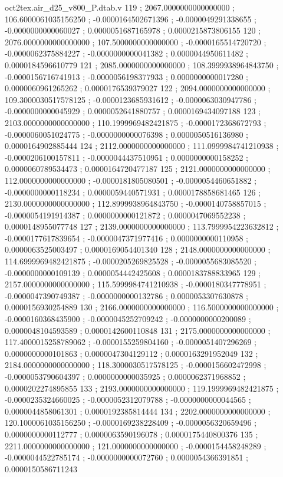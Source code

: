 \begin{filecontents}[overwrite]{oct2tex.air_d25_v800_P.dtab.v}
119 ; 2067.0000000000000000 ; 106.6000061035156250 ; -0.0000164502671396 ; -0.0000049291338655 ; -0.0000000000060027 ; 0.0000051687165978 ; 0.0000215873806155
120 ; 2076.0000000000000000 ; 107.5000000000000000 ; -0.0000165514720720 ; -0.0000062375884227 ; -0.0000000000041382 ; 0.0000044950611482 ; 0.0000184596610779
121 ; 2085.0000000000000000 ; 108.3999938964843750 ; -0.0000156716741913 ; -0.0000056198377933 ; 0.0000000000017280 ; 0.0000060961265262 ; 0.0000176539379027
122 ; 2094.0000000000000000 ; 109.3000030517578125 ; -0.0000123685931612 ; -0.0000063030947786 ; -0.0000000000045929 ; 0.0000052641880757 ; 0.0000169434097188
123 ; 2103.0000000000000000 ; 110.1999969482421875 ; -0.0000172368672793 ; -0.0000060051024775 ; -0.0000000000076398 ; 0.0000050516136980 ; 0.0000164902885444
124 ; 2112.0000000000000000 ; 111.0999984741210938 ; -0.0000206100157811 ; -0.0000044437510951 ; 0.0000000000158252 ; 0.0000060789534473 ; 0.0000164720477187
125 ; 2121.0000000000000000 ; 112.0000000000000000 ; -0.0000181805080501 ; -0.0000054460651882 ; -0.0000000000118234 ; 0.0000059440571931 ; 0.0000178858681465
126 ; 2130.0000000000000000 ; 112.8999938964843750 ; -0.0000140758857015 ; -0.0000054191914387 ; 0.0000000000121872 ; 0.0000047069552238 ; 0.0000148955077748
127 ; 2139.0000000000000000 ; 113.7999954223632812 ; -0.0000177617839654 ; -0.0000047371977416 ; 0.0000000000110958 ; 0.0000063525003497 ; 0.0000169054401340
128 ; 2148.0000000000000000 ; 114.6999969482421875 ; -0.0000205269825528 ; -0.0000055683085520 ; -0.0000000000109139 ; 0.0000054442425608 ; 0.0000183788833965
129 ; 2157.0000000000000000 ; 115.5999984741210938 ; -0.0000180347778951 ; -0.0000047390749387 ; -0.0000000000132786 ; 0.0000053307630878 ; 0.0000156930254889
130 ; 2166.0000000000000000 ; 116.5000000000000000 ; -0.0000160368435900 ; -0.0000045252709242 ; -0.0000000000200089 ; 0.0000048104593589 ; 0.0000142600110848
131 ; 2175.0000000000000000 ; 117.4000015258789062 ; -0.0000155259804160 ; -0.0000051407296269 ; 0.0000000000101863 ; 0.0000047304129112 ; 0.0000163291952049
132 ; 2184.0000000000000000 ; 118.3000030517578125 ; -0.0000156602472998 ; -0.0000053790604397 ; 0.0000000000035925 ; 0.0000062371968852 ; 0.0000202274895855
133 ; 2193.0000000000000000 ; 119.1999969482421875 ; -0.0000235324660025 ; -0.0000052312079788 ; -0.0000000000044565 ; 0.0000044858061301 ; 0.0000192385814444
134 ; 2202.0000000000000000 ; 120.1000061035156250 ; -0.0000169238228409 ; -0.0000056320659496 ; 0.0000000000112777 ; 0.0000063590196078 ; 0.0000175440800376
135 ; 2211.0000000000000000 ; 121.0000000000000000 ; -0.0000154458248289 ; -0.0000044522785174 ; -0.0000000000072760 ; 0.0000054366391851 ; 0.0000150586711243

\end{filecontents}
